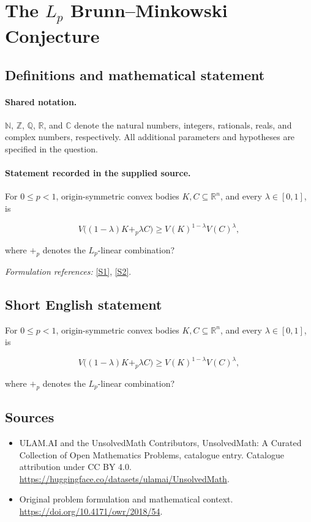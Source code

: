 \documentclass[11pt]{article}
\newcommand{\sref}[2]{\hyperlink{source:#1:#2}{[S#2]}}
\begin{document}
\section{\texorpdfstring{The $L_p$ Brunn–Minkowski Conjecture}{The L\_p Brunn–Minkowski Conjecture}}\label{statement}

\subsection{Definitions and mathematical statement}

\paragraph{Shared notation.}$\mathbb N$, $\mathbb Z$, $\mathbb Q$, $\mathbb R$, and $\mathbb C$ denote the natural numbers, integers, rationals, reals, and complex numbers, respectively. All additional parameters and hypotheses are specified in the question.


\paragraph{Statement recorded in the supplied source.}
For $0\leq p<1$, origin-symmetric convex bodies $K,C\subseteq\mathbb R^n$, and every $\lambda\in[0,1]$, is

$$V\bigl((1-\lambda)K+_p\lambda C\bigr)\geq V(K)^{1-\lambda}V(C)^\lambda,$$

where $+_p$ denotes the $L_p$-linear combination?
\par\smallskip\textit{Formulation references:} \sref{statement}{1}, \sref{statement}{2}.
\subsection{Short English statement}
For $0\leq p<1$, origin-symmetric convex bodies $K,C\subseteq\mathbb R^n$, and every $\lambda\in[0,1]$, is

$$V\bigl((1-\lambda)K+_p\lambda C\bigr)\geq V(K)^{1-\lambda}V(C)^\lambda,$$

where $+_p$ denotes the $L_p$-linear combination?
\subsection{Sources}
\begin{itemize}
\item[\hypertarget{source:statement:1}{S1}] ULAM.AI and the UnsolvedMath Contributors, UnsolvedMath: A Curated Collection of Open Mathematics Problems, catalogue entry. Catalogue attribution under CC BY 4.0.
\url{https://huggingface.co/datasets/ulamai/UnsolvedMath}.
\item[\hypertarget{source:statement:2}{S2}] Original problem formulation and mathematical context.
\url{https://doi.org/10.4171/owr/2018/54}.
\end{itemize}
\label{end:statement}
\end{document}
